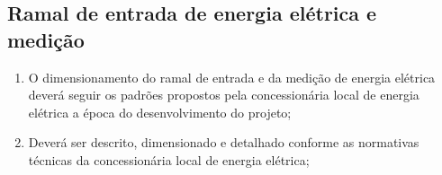 \subsection{Ramal de entrada de energia elétrica e medição} \label{section: entrance}

\begin{enumerate}
	\item O dimensionamento do ramal de entrada e da medição de energia elétrica deverá seguir os padrões propostos pela concessionária local de energia elétrica a época do desenvolvimento do projeto;

	\item Deverá ser descrito, dimensionado e detalhado conforme as normativas técnicas da concessionária local de energia elétrica;
		
	
\end{enumerate}
